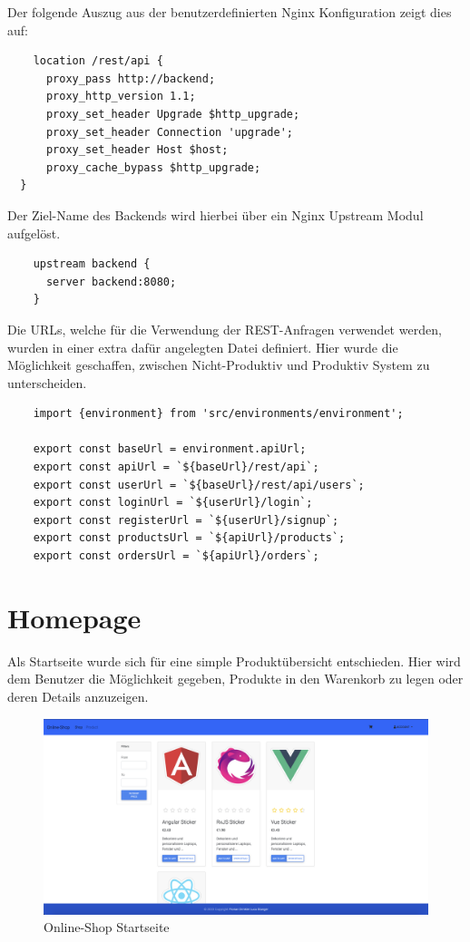Der folgende Auszug aus der benutzerdefinierten Nginx Konfiguration zeigt dies auf:

\begin{verbatim}
	location /rest/api {
      proxy_pass http://backend;
      proxy_http_version 1.1;
      proxy_set_header Upgrade $http_upgrade;
      proxy_set_header Connection 'upgrade';
      proxy_set_header Host $host;
      proxy_cache_bypass $http_upgrade;
  }
\end{verbatim}

Der Ziel-Name des Backends wird hierbei über ein Nginx Upstream Modul aufgelöst.

\begin{verbatim}
	upstream backend {
	  server backend:8080;
	}
\end{verbatim}
\newpage
Die URLs, welche für die Verwendung der REST-Anfragen verwendet werden, wurden in einer extra dafür angelegten Datei definiert. Hier wurde die Möglichkeit geschaffen, zwischen Nicht-Produktiv und Produktiv System zu unterscheiden.

\begin{verbatim}
	import {environment} from 'src/environments/environment';

	export const baseUrl = environment.apiUrl;
	export const apiUrl = `${baseUrl}/rest/api`;
	export const userUrl = `${baseUrl}/rest/api/users`;
	export const loginUrl = `${userUrl}/login`;
	export const registerUrl = `${userUrl}/signup`;
	export const productsUrl = `${apiUrl}/products`;
	export const ordersUrl = `${apiUrl}/orders`;

\end{verbatim}

\section{Homepage}

Als Startseite wurde sich für eine simple Produktübersicht entschieden. Hier wird dem Benutzer die Möglichkeit gegeben, Produkte in den Warenkorb zu legen oder deren Details anzuzeigen.

\begin{figure}[h]
 \centering
 \includegraphics[width=\textwidth,height=0.6\textheight,keepaspectratio]{images/homepage.png}
 \caption{Online-Shop Startseite}
 \label{fig:homepage}
\end{figure}

